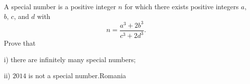 A special number is a positive integer $n$ for which there exists positive integers $a$,  $b$,  $c$,  and $d$ with \[ n = \frac {a^3 + 2b^3} {c^3 + 2d^3}. \] Prove that

i) there are infinitely many special numbers;

ii) $2014$ is not a special number.Romania